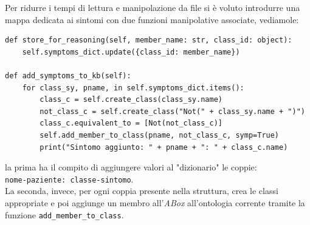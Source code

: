 Per ridurre i tempi di lettura e manipolazione da file si è voluto introdurre una mappa dedicata ai sintomi
con due funzioni manipolative associate, vediamole: 
\begin{verbatim}
def store_for_reasoning(self, member_name: str, class_id: object):
	self.symptoms_dict.update({class_id: member_name})

def add_symptoms_to_kb(self):
	for class_sy, pname, in self.symptoms_dict.items():
		class_c = self.create_class(class_sy.name)
		not_class_c = self.create_class("Not(" + class_sy.name + ")")
		class_c.equivalent_to = [Not(not_class_c)]
		self.add_member_to_class(pname, not_class_c, symp=True)
		print("Sintomo aggiunto: " + pname + ": " + class_c.name)
\end{verbatim}
la prima ha il compito di aggiungere valori al "dizionario" le coppie:\\ \texttt{nome-paziente: classe-sintomo}.\\
La seconda, invece, per ogni coppia presente nella struttura, crea le classi appropriate e poi 
aggiunge un membro all'\textit{ABox} all'ontologia corrente tramite la funzione \texttt{add_member_to_class}.

